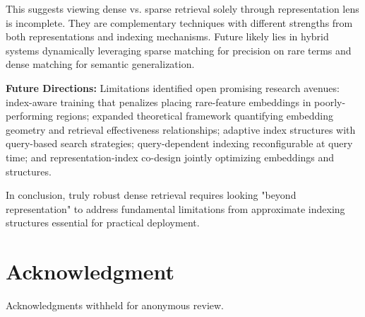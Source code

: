 \documentclass[conference,anonymous]{IEEEtran}
\begin{document}
This suggests viewing dense vs. sparse retrieval solely through representation lens is incomplete. They are complementary techniques with different strengths from both representations and indexing mechanisms. Future likely lies in hybrid systems dynamically leveraging sparse matching for precision on rare terms and dense matching for semantic generalization.

\textbf{Future Directions:} Limitations identified open promising research avenues: index-aware training that penalizes placing rare-feature embeddings in poorly-performing regions; expanded theoretical framework quantifying embedding geometry and retrieval effectiveness relationships; adaptive index structures with query-based search strategies; query-dependent indexing reconfigurable at query time; and representation-index co-design jointly optimizing embeddings and structures.

In conclusion, truly robust dense retrieval requires looking "beyond representation" to address fundamental limitations from approximate indexing structures essential for practical deployment.

\section*{Acknowledgment}

Acknowledgments withheld for anonymous review.
\end{document}
